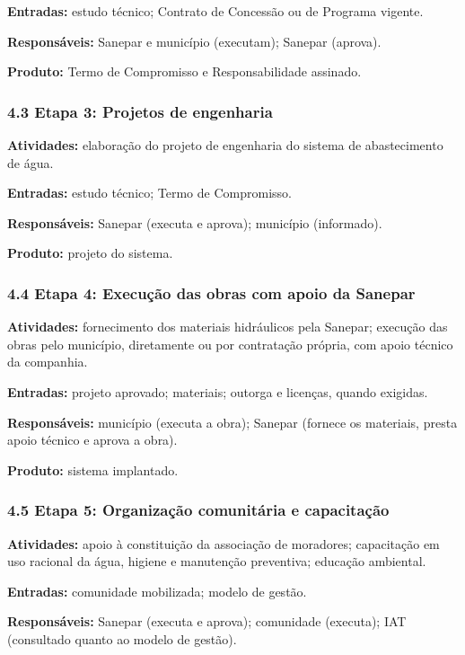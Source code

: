 \textbf{Entradas:} estudo técnico; Contrato de Concessão ou de Programa vigente.

\textbf{Responsáveis:} Sanepar e município (executam); Sanepar (aprova).

\textbf{Produto:} Termo de Compromisso e Responsabilidade assinado.

\subsubsection*{4.3 Etapa 3: Projetos de engenharia}

\textbf{Atividades:} elaboração do projeto de engenharia do sistema de abastecimento de água.

\textbf{Entradas:} estudo técnico; Termo de Compromisso.

\textbf{Responsáveis:} Sanepar (executa e aprova); município (informado).

\textbf{Produto:} projeto do sistema.

\subsubsection*{4.4 Etapa 4: Execução das obras com apoio da Sanepar}

\textbf{Atividades:} fornecimento dos materiais hidráulicos pela Sanepar; execução das obras pelo município, diretamente ou por contratação própria, com apoio técnico da companhia.

\textbf{Entradas:} projeto aprovado; materiais; outorga e licenças, quando exigidas.

\textbf{Responsáveis:} município (executa a obra); Sanepar (fornece os materiais, presta apoio técnico e aprova a obra).

\textbf{Produto:} sistema implantado.

\subsubsection*{4.5 Etapa 5: Organização comunitária e capacitação}

\textbf{Atividades:} apoio à constituição da associação de moradores; capacitação em uso racional da água, higiene e manutenção preventiva; educação ambiental.

\textbf{Entradas:} comunidade mobilizada; modelo de gestão.

\textbf{Responsáveis:} Sanepar (executa e aprova); comunidade (executa); IAT (consultado quanto ao modelo de gestão).

